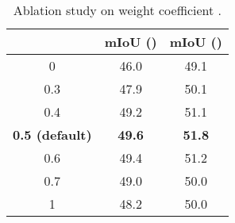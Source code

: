 \documentclass[10pt,twocolumn,letterpaper]{article}
\begin{document}
\begin{table}[h]
	\centering  
	\small
	\caption{Ablation study on weight coefficient .}  
	\label{tab:Ablation_weights}
	\begin{tabular}{ccc}
		\toprule
		\makecell{} & mIoU () & mIoU ()\\
		\hline
	0 & 46.0 & 49.1 \\ 
	0.3 & 47.9 & 50.1 \\  
	0.4 & 49.2 & 51.1 \\  
	\textbf{0.5 (default)} & \textbf{49.6} & \textbf{51.8}  \\
	0.6 & 49.4 & 51.2 \\ 
	0.7 & 49.0 & 50.0 \\  
	1 & 48.2 & 50.0 \\ 
	\bottomrule
	\end{tabular}
	\end{table}

\clearpage
 
\end{document}
